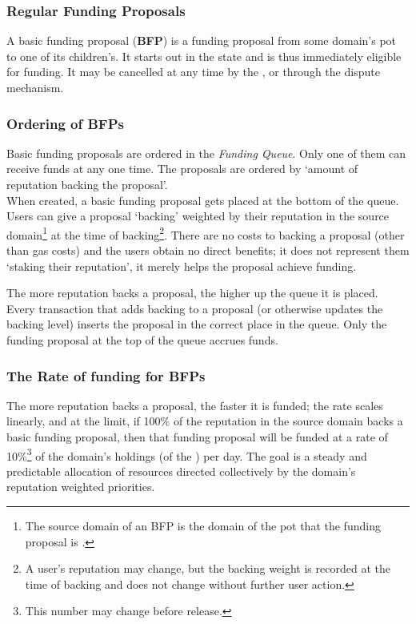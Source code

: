 







\subsubsection{Regular Funding Proposals}\label{subsubsec:BFPs}
A basic funding proposal (\textbf{BFP}) is a funding proposal from some domain's pot to one of its children's. It starts out in the  state and is thus immediately eligible for funding. It may be cancelled at any time by the , or through the dispute mechanism.

\subsubsection*{Ordering of BFPs}
Basic funding proposals are ordered in the \emph{Funding Queue}. Only one of them can receive funds at any one time. The proposals are ordered by `amount of reputation backing the proposal'.\\
When created, a basic funding proposal gets placed at the bottom of the queue. Users can give a proposal `backing' weighted by their reputation in the source domain\footnote{The source domain of an BFP is the domain of the pot that the funding proposal is .} at the time of backing\footnote{A user's reputation may change, but the backing weight is recorded at the time of backing and does not change without further user action.}. There are no costs to backing a proposal (other than gas costs) and the users obtain no direct benefits; it does not represent them `staking their reputation', it merely helps the proposal achieve funding.

The more reputation backs a proposal, the higher up the queue it is placed. Every transaction that adds backing to a proposal (or otherwise updates the backing level) inserts the proposal in the correct place in the queue. Only the funding proposal at the top of the queue accrues funds.\\

\subsubsection*{The Rate of funding for BFPs}
The more reputation backs a proposal, the faster it is funded; the rate scales linearly, and at the limit, if 100\% of the reputation in the source domain backs a basic funding proposal, then that funding proposal will be funded at a rate of 10\%\footnote{This number may change before release.} of the domain's holdings (of the ) per day. 
The goal is a steady and predictable allocation of resources directed collectively by the domain's reputation weighted priorities.

